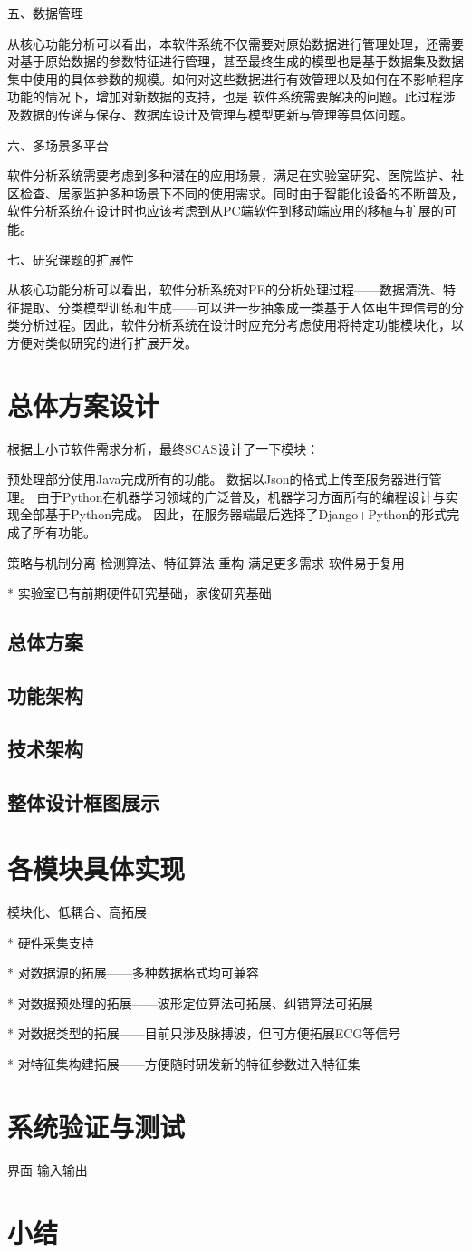 五、数据管理

从核心功能分析可以看出，本软件系统不仅需要对原始数据进行管理处理，还需要对基于原始数据的参数特征进行管理，甚至最终生成的模型也是基于数据集及数据集中使用的具体参数的规模。如何对这些数据进行有效管理以及如何在不影响程序功能的情况下，增加对新数据的支持，也是
软件系统需要解决的问题。此过程涉及数据的传递与保存、数据库设计及管理与模型更新与管理等具体问题。

六、多场景多平台

软件分析系统需要考虑到多种潜在的应用场景，满足在实验室研究、医院监护、社区检查、居家监护多种场景下不同的使用需求。同时由于智能化设备的不断普及，软件分析系统在设计时也应该考虑到从PC端软件到移动端应用的移植与扩展的可能。

七、研究课题的扩展性

从核心功能分析可以看出，软件分析系统对PE的分析处理过程——数据清洗、特征提取、分类模型训练和生成——可以进一步抽象成一类基于人体电生理信号的分类分析过程。因此，软件分析系统在设计时应充分考虑使用将特定功能模块化，以方便对类似研究的进行扩展开发。

\section{总体方案设计}
根据上小节软件需求分析，最终SCAS设计了一下模块：

预处理部分使用Java完成所有的功能。
数据以Json的格式上传至服务器进行管理。
由于Python在机器学习领域的广泛普及，机器学习方面所有的编程设计与实现全部基于Python完成。
因此，在服务器端最后选择了Django+Python的形式完成了所有功能。

策略与机制分离
检测算法、特征算法
重构 满足更多需求
软件易于复用

* 实验室已有前期硬件研究基础，家俊研究基础

\subsection{总体方案}
\subsection{功能架构}
\subsection{技术架构}
\subsection{整体设计框图展示}

\section{各模块具体实现}
模块化、低耦合、高拓展

* 硬件采集支持

* 对数据源的拓展——多种数据格式均可兼容

* 对数据预处理的拓展——波形定位算法可拓展、纠错算法可拓展

* 对数据类型的拓展——目前只涉及脉搏波，但可方便拓展ECG等信号

* 对特征集构建拓展——方便随时研发新的特征参数进入特征集

\section{系统验证与测试}
界面
输入输出
\section{小结}